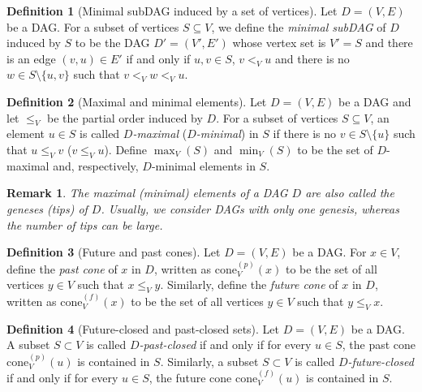 \documentclass[11pt]{article}
\newcommand{\cone}[3]{\mathrm{cone}_{#2}^{(#1)}\left(#3\right)}
\newcommand{\maximal}[2]{\max_{#1}\left(#2\right)}
\newcommand{\minimal}[2]{\min_{#1}\left(#2\right)}
\theoremstyle{plain}
\newtheorem{remark}{Remark}
\theoremstyle{definition}
\newtheorem{definition}{Definition}
\numberwithin{definition}{section}
\numberwithin{lemma}{section}
\numberwithin{ass}{section}
\numberwithin{remark}{section}
\numberwithin{example}{section}
\numberwithin{proposition}{section}
\numberwithin{theorem}{section}
\begin{document}
\begin{definition}[Minimal subDAG induced by a set of vertices]\label{def: minimal subDAG}
Let ${D}=(V,E)$ be a DAG.  For a subset of vertices $S\subseteq V$, we define the \emph{minimal subDAG} of ${D}$ induced by $S$ to be the DAG ${D'}=(V',E')$ whose vertex set is $V'=S$ and there is an edge $(v,u)\in E'$ if and only if $u,v\in S$, $v<_{{V}}u$ and there is no $w\in S\setminus \{u,v\}$ such that $v<_{{V}} w <_{{V}}u$. 
\end{definition}
  

\begin{definition}[Maximal and minimal elements]\label{def: min and max elements} Let ${D}=(V,E)$ be a DAG and let $\le_{{V}}$ be the partial order induced by ${D}$. For a subset of vertices $S\subseteq V$,  an element $u\in S$ is called \emph{${D}$-maximal} (\emph{${D}$-minimal}) in $S$ if there is no $v\in S\setminus\{u\}$ such that $u\le_{{V}}  v$ ($v\le_{{V}}  u$). Define $\maximal{V}{S}$ and $\minimal{V}{S}$ to be the set of ${D}$-maximal and, respectively, ${D}$-minimal elements in $S$.
\end{definition}

\begin{remark}
The maximal (minimal) elements of a DAG $D$ are also called the geneses (tips) of $D$. Usually, we consider DAGs with only one genesis, whereas the number of tips can be large. 
\end{remark}

\begin{definition}[Future and past cones] \label{def: future and past cones}
Let ${D}=(V,E)$ be a DAG. For $x\in V$, define the \emph{past cone} of $x$ in ${D}$, written as $\cone{p}{V}{x}$ 
to be the set of all vertices $y\in V$ such that $x\le_{{V}} y$. Similarly, define the \emph{future cone} of $x$ in ${D}$, written as $\cone{f}{V}{x}$ 
to be the set of all vertices $y\in V$ such that $y\le_{{V}} x$. 
\end{definition}

\begin{definition}[Future-closed and past-closed sets]\label{def: future and past closed}
Let ${D}=(V,E)$ be a DAG. A subset $S\subset V$ is called \emph{${D}$-past-closed} if and only if for every $u\in S$, the past cone $\cone{p}{{V}}{u}$ is contained in $S$. 
Similarly, a subset $S\subset V$ is called \emph{${D}$-future-closed} if and only if for every $u\in S$, the future cone $\cone{f}{{V}}{u}$  is contained in $S$. 
\end{definition}
\end{document}
